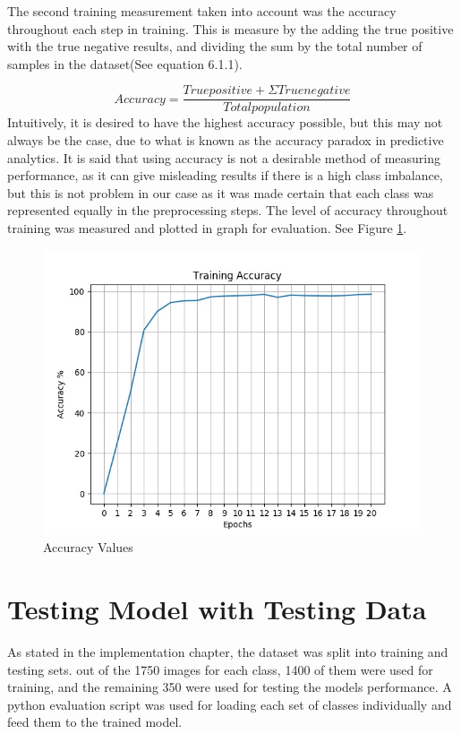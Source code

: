 \newpage

The second training measurement taken into account was the accuracy throughout each step in training. This is measure by the adding the true positive with the true negative results, and dividing the sum by the total number of samples in the dataset(See equation 6.1.1).


\begin{equation}\label{eq:ac}
Accuracy = 
\frac{
	True positive + Σ True negative
}{
	Total population
}
\end{equation}
Intuitively, it is desired to have the highest accuracy possible, but this may not always be the case, due to what is known as the accuracy paradox in predictive analytics. It is said that using accuracy is not a desirable method of measuring performance, as it can give misleading results if there is a high class imbalance, but this is not problem in our case as it was made certain that each class was represented equally in the preprocessing steps.  The level of accuracy throughout training was measured and plotted in graph for evaluation. See Figure \ref{acc}.

\begin{figure}[ht]
	\begin{center}
		\advance\leftskip-3cm
		\advance\rightskip-3cm
		\includegraphics[keepaspectratio=true,scale=0.7]{__resources/Results/accuracy.jpg}
		\caption{Accuracy Values}
		\label{acc}
	\end{center}
\end{figure}

\newpage

\section{Testing Model with Testing Data}
As stated in the implementation chapter, the dataset was split into training and testing sets. out of the 1750 images for each class, 1400 of them were used for training, and the remaining 350 were used for testing the models performance. A python evaluation script was used for loading each set of classes individually and feed them to the trained model. 

